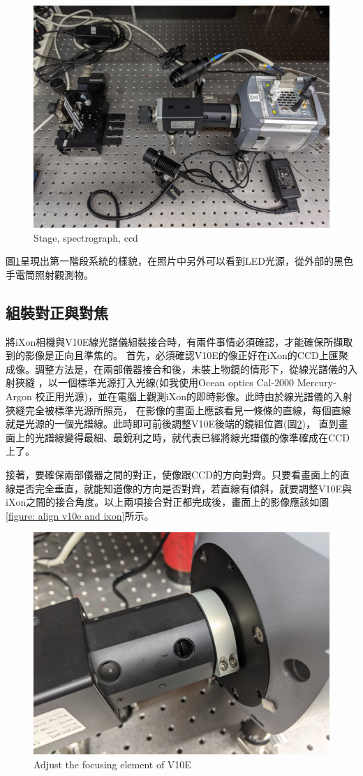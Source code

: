 \documentclass[12pt]{article}
\begin{document}
    \begin{figure}[t]
        \centering
        \includegraphics[width=0.65\linewidth]{PXL_20210723_094307842.jpg}
        \caption{Stage, spectrograph, ccd}
        \label{figure: 1 stage setup}
    \end{figure}
    
    圖\ref{figure: 1 stage setup}呈現出第一階段系統的樣貌，在照片中另外可以看到LED光源，從外部的黑色手電筒照射觀測物。

    \subsection{組裝對正與對焦}
    將iXon相機與V10E線光譜儀組裝接合時，有兩件事情必須確認，才能確保所擷取到的影像是正向且準焦的。
    首先，必須確認V10E的像正好在iXon的CCD上匯聚成像。調整方法是，在兩部儀器接合和後，未裝上物鏡的情形下，從線光譜儀的入射狹縫
    ，以一個標準光源打入光線(如我使用Ocean optics Cal-2000 Mercury-Argon 校正用光源)，並在電腦上觀測iXon的即時影像。此時由於線光譜儀的入射狹縫完全被標準光源所照亮，
    在影像的畫面上應該看見一條條的直線，每個直線就是光源的一個光譜線。此時即可前後調整V10E後端的鏡組位置(圖\ref{figure: specim bfp lens})，
    直到畫面上的光譜線變得最細、最銳利之時，就代表已經將線光譜儀的像準確成在CCD上了。

    接著，要確保兩部儀器之間的對正，使像跟CCD的方向對齊。只要看畫面上的直線是否完全垂直，就能知道像的方向是否對齊，若直線有傾斜，就要調整V10E與iXon之間的接合角度。以上兩項接合對正都完成後，畫面上的影像應該如圖\ref{figure: align v10e and ixon}所示。

    \begin{figure}[t]
        \centering
        \includegraphics[width=0.65\linewidth]{PXL_20210507_105656554.jpg}
        \caption{Adjust the focusing element of V10E}
        \label{figure: specim bfp lens}
    \end{figure}
\end{document}

